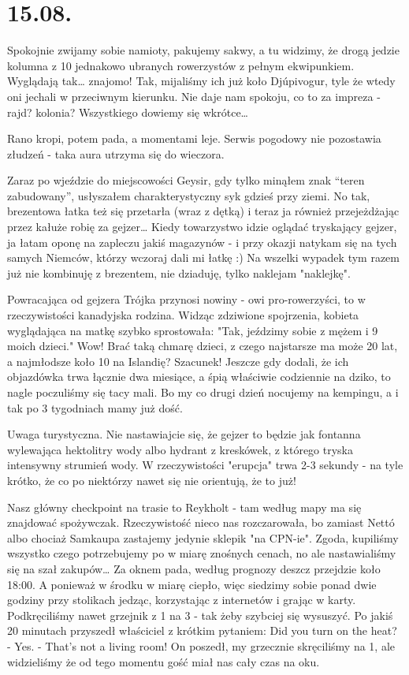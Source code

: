 \chapter {15.08.}

Spokojnie zwijamy sobie namioty, pakujemy sakwy, a tu widzimy, że drogą jedzie kolumna z 10 jednakowo ubranych rowerzystów z pełnym ekwipunkiem. Wyglądają tak… znajomo! Tak, mijaliśmy ich już koło Djúpivogur, tyle że wtedy oni jechali w przeciwnym kierunku. Nie daje nam spokoju, co to za impreza - rajd? kolonia? Wszystkiego dowiemy się wkrótce…

Rano kropi, potem pada, a momentami leje. Serwis pogodowy nie pozostawia złudzeń - taka aura utrzyma się do wieczora.

Zaraz po wjeździe do miejscowości Geysir, gdy tylko minąłem znak “teren zabudowany”, usłyszałem charakterystyczny syk gdzieś przy ziemi. No tak, brezentowa łatka też się przetarła (wraz z dętką) i teraz ja również przejeżdżając przez kałuże robię za gejzer…  Kiedy towarzystwo idzie oglądać tryskający gejzer, ja łatam oponę na zapleczu jakiś magazynów - i przy okazji natykam się na tych samych Niemców, którzy wczoraj dali mi łatkę :) Na wszelki wypadek tym razem już nie kombinuję z brezentem, nie dziaduję, tylko naklejam "naklejkę".

Powracająca od gejzera Trójka przynosi nowiny - owi pro-rowerzyści, to w rzeczywistości kanadyjska rodzina. Widząc zdziwione spojrzenia, kobieta wyglądająca na matkę szybko sprostowała: "Tak, jeździmy sobie z mężem i 9 moich dzieci." Wow! Brać taką chmarę dzieci, z czego najstarsze ma może 20 lat, a najmłodsze koło 10 na Islandię? Szacunek! Jeszcze gdy dodali, że ich objazdówka trwa łącznie dwa miesiące, a śpią właściwie codziennie na dziko, to nagle poczuliśmy się tacy mali. Bo my co drugi dzień nocujemy na kempingu, a i tak po 3 tygodniach mamy już dość.

Uwaga turystyczna. Nie nastawiajcie się, że gejzer to będzie jak fontanna wylewająca hektolitry wody albo hydrant z kreskówek, z którego tryska intensywny strumień wody. W rzeczywistości "erupcja" trwa 2-3 sekundy - na tyle krótko, że co po niektórzy nawet się nie orientują, że to już!

Nasz główny checkpoint na trasie to Reykholt - tam według mapy ma się znajdować spożywczak. Rzeczywistość nieco nas rozczarowała, bo zamiast Nettó albo chociaż Samkaupa zastajemy jedynie sklepik "na CPN-ie". Zgoda, kupiliśmy wszystko czego potrzebujemy po w miarę znośnych cenach, no ale nastawialiśmy się na szał zakupów… Za oknem pada, według prognozy deszcz przejdzie koło 18:00. A ponieważ w środku w miarę ciepło, więc siedzimy sobie ponad dwie godziny przy stolikach jedząc, korzystając z internetów i grając w karty. Podkręciliśmy nawet grzejnik z 1 na 3 - tak żeby szybciej się wysuszyć. Po jakiś 20 minutach przyszedł właściciel z krótkim pytaniem: Did you turn on the heat? - Yes. - That’s not a living room! On poszedł, my grzecznie skręciliśmy na 1, ale widzieliśmy że od tego momentu gość miał nas cały czas na oku.

